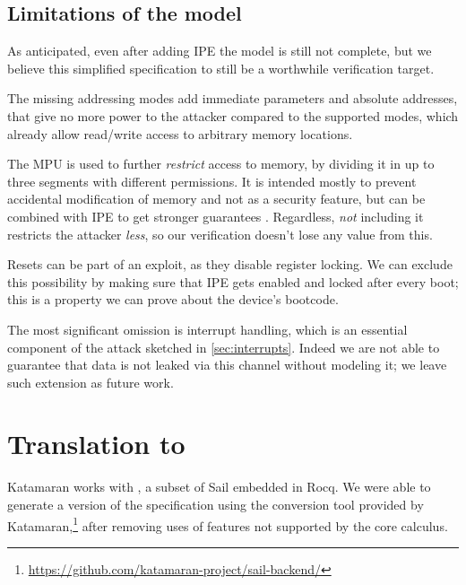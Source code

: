 \subsection{Limitations of the model}
\label{sec:model-limitations}

As anticipated, even after adding IPE the model is still not complete, but we believe this simplified specification to still be a worthwhile verification target.

The missing addressing modes add immediate parameters and absolute addresses, that give no more power to the attacker compared to the supported modes, which already allow read/write access to arbitrary memory locations.

The MPU is used to further \emph{restrict} access to memory, by dividing it in up to three segments with different permissions. It is intended mostly to prevent accidental modification of memory and not as a security feature, but can be combined with IPE to get stronger guarantees \cite{Bognar2024}. Regardless, \emph{not} including it restricts the attacker \emph{less}, so our verification doesn't lose any value from this.

Resets can be part of an exploit, as they disable register locking. We can exclude this possibility by making sure that IPE gets enabled and locked after every boot; this is a property we can prove about the device's bootcode.

The most significant omission is interrupt handling, which is an essential component of the attack sketched in \cref{sec:interrupts}. Indeed we are not able to guarantee that data is not leaked via this channel without modeling it; we leave such extension as future work.

\section{Translation to \texorpdfstring{\usail}{μSail}}
\label{sec:usail-translation}

Katamaran works with \usail, a subset of Sail embedded in Rocq. We were able to generate a \usail version of the specification using the conversion tool provided by Katamaran,\footnote{\url{https://github.com/katamaran-project/sail-backend/}} after removing uses of features not supported by the core calculus.

